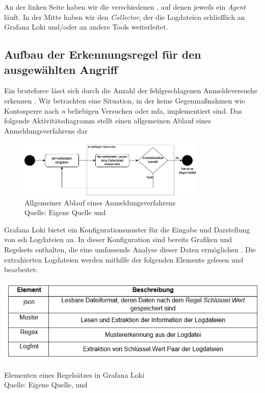 An der linken Seite haben wir die verschiedenen , auf denen jeweils ein \textit{Agent} läuft. In der Mitte haben wir den \textit{Collector}, der die Logdateien schließlich an Grafana Loki und/oder an andere Tools weiterleitet.

\newpage
\subsection{Aufbau der Erkennungsregel für den ausgewählten Angriff}
Ein \gls{bruteforce} lässt sich durch die Anzahl der fehlgeschlagenen Anmeldeversuche erkennen \citep{Selvaganesh_SplunkBruteForce}. Wir betrachten eine Situation, in der keine Gegenmaßnahmen wie Kontosperre nach \textit{n} beliebigen Versuchen oder \gls{mfa}, implementiert sind. Das folgende Aktivitätsdiagramm stellt einen allgemeinen Ablauf eines Anmeldungsverfahrens dar

\begin{figure}[H]
   \centering
   \includegraphics[width=0.8\textwidth]{assets/Anmeldeverfahren.drawio.png}
   \caption[Allgemeiner Ablauf eines Anmeldungsverfahrens]
   {Allgemeiner Ablauf eines Anmeldungsverfahrens \\Quelle: Eigene Quelle und \citep{Selvaganesh_SplunkBruteForce}}
   \centering
\end{figure}

Grafana Loki bietet ein Konfigurationsmuster für die Eingabe und Darstellung von \gls{ssh} Logdateien an. In dieser Konfiguration sind bereits Grafiken und Regelsets enthalten, die eine umfassende Analyse dieser Daten ermöglichen \citep{VoidQuark_sshlogs}. Die extrahierten Logdateien werden mithilfe der folgenden Elemente gelesen und bearbeitet:

\begin{table}[H]
   \includegraphics[width=\linewidth]{assets/tabelle_sshgrafana.png}
   \caption[Elementen eines Regelsätzes in Grafana Loki]
   {Elementen eines Regelsätzes in Grafana Loki \\Quelle: Eigene Quelle, \citep{VoidQuark_sshlogs} und \citep{Setter_Logfmt}}
\end{table}



